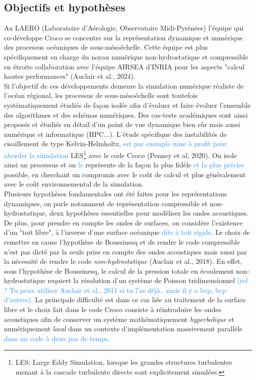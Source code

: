\documentclass{rapportECC}
\newcommand{\FAadd}[1]{\textcolor{DodgerBlue}{{#1}}}                     %
\begin{document}
\subsection{Objectifs et hypothèses}
Au LAERO (Laboratoire d'Aérologie, Observatoire Midi-Pyrénées) l'équipe qui co-développe Croco se concentre sur la représentation dynamique et numérique des processus océaniques de sous-mésoéchelle. Cette équipe est plus spécifiquement en charge du noyau numérique non-hydrostatique et compressible en étroite collaboration avec l'équipe AIRSEA d'INRIA pour les aspects "calcul hautes performances" (Auclair et al., 2024).\\
Si l'objectif de ces développements demeure la simulation numérique réaliste de l'océan régional, les processus de sous-mésoéchelle sont toutefois systématiquement étudiés de façon isolée afin d'évaluer et faire évoluer l'ensemble des algorithmes et des schémas numériques. Des cas-tests académiques sont ainsi proposés et étudiés en détail d'un point de vue dynamique bien sûr mais aussi numérique et informatique (HPC...). L'étude spécifique des instabilités de cisaillement de type Kelvin-Helmholtz, \FAadd{est par exemple mise à profit pour aborder la simulation} LES\footnote{LES: Large Eddy Simulation, lorsque les grandes structures turbulentes menant à la cascade turbulente directe sont explicitement simulées.} avec le code Croco (Penney et al, 2020).
 On isole ainsi un processus et on \FAadd{le} représente de la façon la plus fidèle \FAadd{et la plus précise} possible, en cherchant un compromis avec le coût de calcul et plus généralement avec le coût environnemental de la simulation.
\\
Plusieurs hypothèses fondamentales ont été faites pour les représentations dynamiques, on parle notamment de représentation compressible et non-hydrostatique, deux hypothèses essentielles pour modéliser les ondes acoustiques. De plus, pour prendre en compte les ondes de surfaces, on considère l'existence d'un "toit libre", à l'inverse d'une surface océanique \FAadd{dite à toit rigide}. Le choix de remettre en cause l'hypothèse de Boussinesq et de rendre le code compressible n'est pas dicté par la seule prise en compte des ondes acoustiques mais aussi par la nécessité de rendre le code \textit{non-hydrostatique} (Auclair et al., 2018). En effet, sous l'hypothèse de Boussinesq, le calcul de la pression totale en écoulement non-hydrostatique requiert la résolution d'un système de Poisson tridimensionnel \FAadd{(ref ? Tu peux utiliser Auclair et al., 2011 si tu l'as déjà.. mais il y a bcp, bcp d'autres)}. La principale difficulté est dans ce cas liée au traitement de la surface libre et le choix fait dans le code Croco consiste à réintroduire les ondes acoustiques afin de conserver un système mathématiquement \textit{hyperbolique} et numériquement \textit{local} dans un contexte d'implémentation massivement parallèle \FAadd{dans un code à deux pas de temps}.
\end{document}
